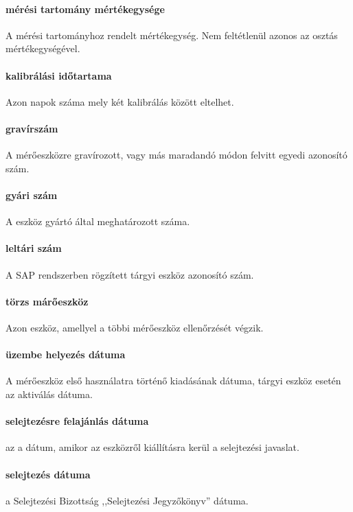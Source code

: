 \paragraph*{mérési tartomány mértékegysége} A mérési tartományhoz rendelt
mértékegység. Nem feltétlenül azonos az osztás mértékegységével.

\paragraph*{kalibrálási időtartama} Azon napok száma mely két kalibrálás között eltelhet.

\paragraph*{gravírszám} A mérőeszközre gravírozott, vagy más maradandó módon felvitt
egyedi azonosító szám.

\paragraph*{gyári szám} A eszköz gyártó által meghatározott száma.

\paragraph*{leltári szám} A SAP rendszerben rögzített tárgyi eszköz azonosító szám.

\paragraph*{törzs márőeszköz} Azon eszköz, amellyel a többi mérőeszköz ellenőrzését 
végzik.

\paragraph*{üzembe helyezés dátuma} A mérőeszköz első használatra történő 
kiadásának dátuma, tárgyi eszköz esetén az aktiválás dátuma.

\paragraph*{selejtezésre felajánlás dátuma} az a dátum, amikor az eszközről kiállításra
kerül a selejtezési javaslat.

\paragraph{selejtezés dátuma} a Selejtezési Bizottság ,,Selejtezési Jegyzőkönyv'' 
dátuma.

